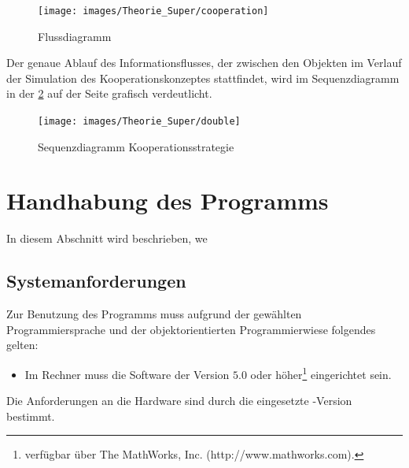 \begin{figure}[h!]
	\begin{center}
	\texttt{[image: images/Theorie\_Super/cooperation]}
	\end{center}
\caption{Flussdiagramm}
\label{fig:coop}
\end{figure}

Der genaue Ablauf des Informationsflusses, der zwischen den Objekten im Verlauf
der Simulation des Kooperationskonzeptes stattfindet, wird im Sequenzdiagramm in
der \cref{fig:uml_coop} auf der Seite \pageref{fig:uml_coop} grafisch
verdeutlicht.
\begin{figure}[h]
	\begin{center}
	\texttt{[image: images/Theorie\_Super/double]}
	\end{center}
\caption{Sequenzdiagramm Kooperationsstrategie}
\label{fig:uml_coop}
\end{figure}



\section{Handhabung des Programms}
\label{sc:handhabung}
In diesem Abschnitt wird beschrieben, we
\subsection{Systemanforderungen}

Zur Benutzung des Programms muss aufgrund der gewählten Programmiersprache und
der objektorientierten Programmierwiese folgendes gelten:

\begin{itemize}
	\item Im Rechner muss die Software \matlab der Version $5.0$ oder
	höher\footnote{ \matlab verfügbar über The MathWorks, Inc.
	(http://www.mathworks.com).} eingerichtet sein.
\end{itemize}

Die Anforderungen an die Hardware sind durch die eingesetzte \matlab-Version
bestimmt.

